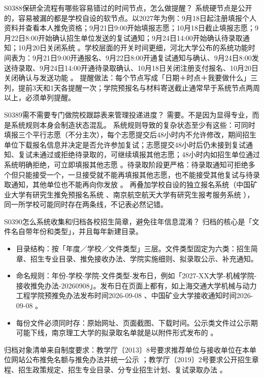 \begin{qa}{S0388}{保研全流程有哪些容易错过的时间节点，怎么做提醒？}
系统硬节点是公开的，容易被漏的都是学校自设的软节点。以2027年为例：9月18日起注册填报个人资料并查看本人推免资格；9月21日9:00开始填报志愿；10月18日截止填报志愿；9月22日8:00开始确认招生单位发送的复试通知；9月24日14:00开始确认待录取通知；10月20日关闭系统 。学校层面的开关时间更细，河北大学公布的系统功能时间表为：9月21日9:00开通报名、9月22日8:00开通复试通知与确认、9月24日8:00发送待录取、9月24日14:00开通待录取确认、10月18日关闭注册支付报名、10月20日关闭确认与发送功能 。
提醒做法：每个节点写成「日期＋时点＋我要做什么」三列，提前3天和1天各提醒一次；学院预报名与材料寄送截止通常早于系统节点两周以上，必须单列提醒。
\end{qa}

\begin{qa}{S0389}{需不需要专门做院校跟踪表来管理投递进度？}
需要。不是因为显得专业，而是系统规则本身会制造状态混乱。
系统规则导致的复杂状态至少有这些：可同时填报三个平行志愿（不分主次），每个志愿提交后48小时内不允许修改，期间招生单位下载报名信息并决定是否允许参加复试；志愿提交48小时后仍未接到复试通知、复试未通过或拒绝待录取的，可继续填报其他志愿；48小时内如招生单位通过系统明确拒绝，可立即填报其他志愿 。待录取阶段更严格：待录取通知可拒绝多个但只能接受一个，一旦接受就不能再填报其他志愿，也不能接受其他复试与待录取通知，其他单位也不能再向你发放 。
再叠加学校自设的独立报名系统（中国矿业大学有研究生推免预报名系统 、南京航空航天大学有研究生报考服务系统 ），同一所学校可能同时存在两条线，不记表必然记错。
\end{qa}

\begin{qa}{S0390}{怎么系统收集和归档各校招生简章，避免往年信息混淆？}
归档的核心是「文件名自带年份和类型」，并且每年新建目录。
\begin{itemize}
  \item 目录结构：按「年度／学校／文件类型」三层。文件类型固定为六类：招生简章、招生专业目录、推免接收办法、学院实施细则、拟录取公示、补充通知。
  \item 命名规则：年份-学校-学院-文件类型-发布日，例如「2027-XX大学-机械学院-接收推免办法-20260908」。发布日在页面上都有，如上海交通大学机械与动力工程学院预推免办法发布时间2026-09-08 、中国矿业大学接收通知时间2026-09-08 。
  \item 每份文件必须同时存：原始网址、页面截图、下载时间。公示类文件过公示期可能下线，南京理工大学的拟录取名单就是以附件形式发布的 。
\end{itemize}
归档对象清单来自制度要求：教学厅〔2013〕8号要求推荐单位与接收单位在本单位网站公布推免名额与推免办法并统一公示 ；教学厅〔2019〕2号要求公开招生章程、招生政策规定、招生专业目录、分专业招生计划、复试录取办法 。
\end{qa}

